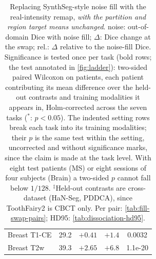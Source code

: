 \begin{table}[t]
\begin{tabular}{lcccc}
\quad Breast T1-CE & 29.2 & $+0.41$ & $+1.4$ & 0.0032 \\
\quad Breast T2w & 39.3 & $+2.65$ & $+6.8$ & 1.1e-20 \\
\bottomrule
\end{tabular}
\caption{Replacing SynthSeg-style noise fill with the real-intensity remap,
\emph{with the partition and region target means unchanged}. noise:
out-of-domain Dice with noise fill; $\Delta$: Dice change at the swap; rel.:
$\Delta$ relative to the noise-fill Dice. Significance is tested once per task
(bold rows; the test annotated in \cref{fig:ladder}): two-sided paired Wilcoxon
on patients, each patient contributing its mean difference over the held-out
contrasts and training modalities it appears in, Holm-corrected across the
seven tasks ($^*$: $p<0.05$). The indented setting rows break each task into
its training modalities; their $p$ is the same test within the setting,
uncorrected and without significance marks, since the claim is made at the
task level. With eight test patients (MS) or eight sessions of four subjects
(Brain) a two-sided $p$ cannot fall below $1/128$. $^\ddagger$Held-out
contrasts are cross-dataset (HaN-Seg, PDDCA), since ToothFairy2 is CBCT only.
Per pair: \cref{tab:fill-swap-pairs}; HD95: \cref{tab:dissociation-hd95}.}
\label{tab:dissociation}
\end{table}

